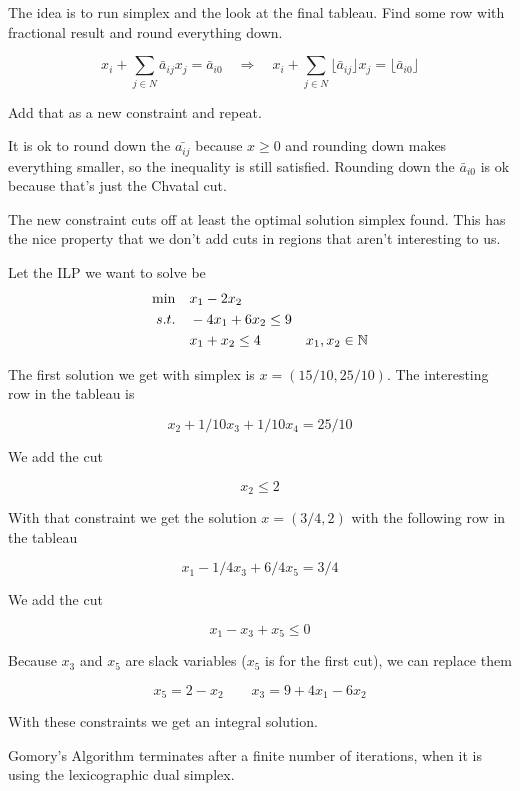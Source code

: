 The idea is to run simplex and the look at the final tableau. Find some row with fractional result and round everything down. 

\[x_i + \sum_{j\in N} \bar a_{ij} x_j = \bar a_{i0} \quad \Rightarrow \quad x_i + \sum_{j\in N} \lfloor\bar a_{ij}\rfloor x_j = \lfloor\bar a_{i0}\rfloor\]

Add that as a new constraint and repeat. 

It is ok to round down the $\bar{a_{ij}}$ because $x\geq 0$ and rounding down makes everything smaller, so the inequality is still satisfied. Rounding down the $\bar a_{i0}$ is ok because that's just the Chvatal cut.

The new constraint cuts off at least the optimal solution simplex found. This has the nice property that we don't add cuts in regions that aren't interesting to us.

\begin{Ex} Let the ILP we want to solve be
\begin{align*}
\min \quad& x_1-2x_2\\
s.t. \quad& -4x_1 +6x_2 \leq 9\\
& x_1+x_2 \leq 4
&x_1,x_2 \in \mathbb{N}
\end{align*}

The first solution we get with simplex is $x=(15/10,25/10)$. The interesting row in the tableau is

\[x_2+1/10 x_3 + 1/10x_4 = 25/10\]

We add the cut

\[x_2 \leq 2\]

With that constraint we get the solution $x=(3/4,2)$ with the following row in the tableau

\[x_1-1/4x_3 +6/4 x_5 = 3/4\]

We add the cut

\[x_1-x_3+x_5\leq 0\]

Because $x_3$ and $x_5$ are slack variables ($x_5$ is for the first cut), we can replace them 

\[x_5 = 2-x_2\qquad x_3=9+4x_1-6x_2\]

With these constraints we get an integral solution.
\end{Ex}

\begin{thm} Gomory's Algorithm terminates after a finite number of iterations, when it is using the lexicographic dual simplex.
\end{thm}

